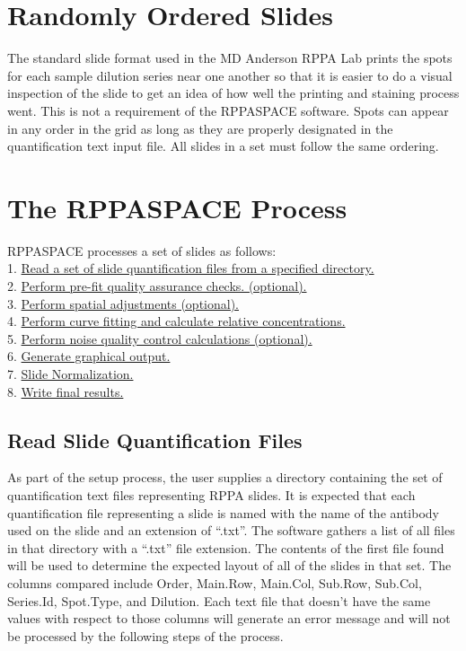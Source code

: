 \documentclass[
]{article}
\begin{document}
\hypertarget{random_order}{%
\section{Randomly Ordered Slides}\label{random_order}}

The standard slide format used in the MD Anderson RPPA Lab prints the
spots for each sample dilution series near one another so that it is
easier to do a visual inspection of the slide to get an idea of how well
the printing and staining process went. This is not a requirement of the
RPPASPACE software. Spots can appear in any order in the grid as long as
they are properly designated in the quantification text input file. All
slides in a set must follow the same ordering.

\hypertarget{process}{%
\section{The RPPASPACE Process}\label{process}}

RPPASPACE processes a set of slides as follows:\\
1. \protect\hyperlink{process_1}{Read a set of slide quantification
files from a specified directory.}\\
2. \protect\hyperlink{process_2}{Perform pre-fit quality assurance
checks. (optional).}\\
3. \protect\hyperlink{process_3}{Perform spatial adjustments
(optional).}\\
4. \protect\hyperlink{process_4}{Perform curve fitting and calculate
relative concentrations.}\\
5. \protect\hyperlink{process_5}{Perform noise quality control
calculations (optional).}\\
6. \protect\hyperlink{process_6}{Generate graphical output.}\\
7. \protect\hyperlink{process_7}{Slide Normalization.}\\
8. \protect\hyperlink{process_8}{Write final results.}

\hypertarget{process_1}{%
\subsection{Read Slide Quantification Files}\label{process_1}}

As part of the setup process, the user supplies a directory containing
the set of quantification text files representing RPPA slides. It is
expected that each quantification file representing a slide is named
with the name of the antibody used on the slide and an extension of
``.txt''. The software gathers a list of all files in that directory
with a ``.txt'' file extension. The contents of the first file found
will be used to determine the expected layout of all of the slides in
that set. The columns compared include Order, Main.Row, Main.Col,
Sub.Row, Sub.Col, Series.Id, Spot.Type, and Dilution. Each text file
that doesn't have the same values with respect to those columns will
generate an error message and will not be processed by the following
steps of the process.
\end{document}
